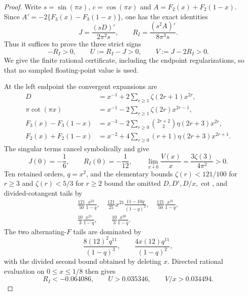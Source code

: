 \begin{proof}
Write $s=\sin(\pi x)$, $c=\cos(\pi x)$ and
$A=F_2(x)+F_2(1-x)$.  Since
$A'=-2\{F_3(x)-F_3(1-x)\}$, one has the exact identities
\begin{equation}\label{JC:eq:regular-ratio-derivative-identities}
 J=\frac{(sD)'}{2\pi^2s},\qquad
 R_I=\frac{(s^2A)'}{8\pi^3s}.
\end{equation}
Thus it suffices to prove the three strict signs
\[
 -R_I>0,\qquad U:=R_I-J>0,\qquad V:=J-2R_I>0.
\]
We give the finite rational certificate, including the endpoint
regularizations, so that no sampled floating-point value is used.

At the left endpoint the convergent expansions are
\begin{align*}
 D&=x^{-1}+2\sum_{r\ge1}\zeta(2r+1)x^{2r},\\
 \pi\cot(\pi x)&=x^{-1}-2\sum_{r\ge1}\zeta(2r)x^{2r-1},\\
 F_3(x)-F_3(1-x)
 &=x^{-3}-2\sum_{r\ge0}\binom{2r+2}{2}\eta(2r+3)x^{2r},\\
 F_2(x)+F_2(1-x)
 &=x^{-2}+4\sum_{r\ge0}(r+1)\eta(2r+3)x^{2r+1}.
\end{align*}
The singular terms cancel symbolically and give
\[
 J(0)=-\frac16,\qquad R_I(0)=-\frac1{12},\qquad
 \lim_{x\downarrow0}\frac{V(x)}x
 =\frac{3\zeta(3)}{4\pi^2}>0.
\]
Ten retained orders, $q=x^2$, and the elementary bounds
$\zeta(r)<121/100$ for $r\ge3$ and $\zeta(r)<5/3$ for $r\ge2$
bound the omitted $D,D',D/x,\cot$, and divided-cotangent tails by
\begin{gather*}
 \frac{121}{50}\frac{x^{22}}{1-q},\quad
 \frac{121}{25}x^{21}\frac{11-10q}{(1-q)^2},\quad
 \frac{121}{50}\frac{x^{21}}{1-q},\\
 \frac{10}{3}\frac{x^{21}}{1-q},\qquad
 \frac{10}{3}\frac{x^{20}}{1-q}.
\end{gather*}
The two alternating-$F$ tails are dominated by
\[
 \frac{8(12)^2q^{11}}{(1-q)^3},\qquad
 \frac{4x(12)q^{11}}{(1-q)^2},
\]
with the divided second bound obtained by deleting $x$.  Directed rational
evaluation on $0\le x\le1/8$ then gives
\begin{equation}\label{JC:eq:regular-ratio-left-certificate}
 R_I<-0.064086,\qquad U>0.035346,\qquad V/x>0.034494.
\end{equation}


\end{proof}
